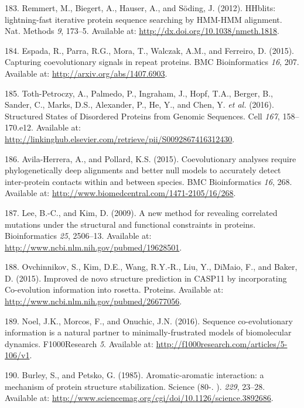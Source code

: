 \documentclass[11pt,a4paper,twoside]{book}
\theoremstyle{definition}
\theoremstyle{definition}
\theoremstyle{remark}
\begin{document}
\hypertarget{ref-Remmert2012}{}
183. Remmert, M., Biegert, A., Hauser, A., and Söding, J. (2012).
HHblits: lightning-fast iterative protein sequence searching by HMM-HMM
alignment. Nat. Methods \emph{9}, 173--5. Available at:
\url{http://dx.doi.org/10.1038/nmeth.1818}.

\hypertarget{ref-Espada2014}{}
184. Espada, R., Parra, R.G., Mora, T., Walczak, A.M., and Ferreiro, D.
(2015). Capturing coevolutionary signals in repeat proteins. BMC
Bioinformatics \emph{16}, 207. Available at:
\url{http://arxiv.org/abs/1407.6903}.

\hypertarget{ref-Toth-Petroczy2016}{}
185. Toth-Petroczy, A., Palmedo, P., Ingraham, J., Hopf, T.A., Berger,
B., Sander, C., Marks, D.S., Alexander, P., He, Y., and Chen, Y.
\emph{et al.} (2016). Structured States of Disordered Proteins from
Genomic Sequences. Cell \emph{167}, 158--170.e12. Available at:
\url{http://linkinghub.elsevier.com/retrieve/pii/S0092867416312430}.

\hypertarget{ref-Avila-Herrera2015a}{}
186. Avila-Herrera, A., and Pollard, K.S. (2015). Coevolutionary
analyses require phylogenetically deep alignments and better null models
to accurately detect inter-protein contacts within and between species.
BMC Bioinformatics \emph{16}, 268. Available at:
\url{http://www.biomedcentral.com/1471-2105/16/268}.

\hypertarget{ref-Lee2009}{}
187. Lee, B.-C., and Kim, D. (2009). A new method for revealing
correlated mutations under the structural and functional constraints in
proteins. Bioinformatics \emph{25}, 2506--13. Available at:
\url{http://www.ncbi.nlm.nih.gov/pubmed/19628501}.

\hypertarget{ref-Ovchinnikov2015b}{}
188. Ovchinnikov, S., Kim, D.E., Wang, R.Y.-R., Liu, Y., DiMaio, F., and
Baker, D. (2015). Improved de novo structure prediction in CASP11 by
incorporating Co-evolution information into rosetta. Proteins. Available
at: \url{http://www.ncbi.nlm.nih.gov/pubmed/26677056}.

\hypertarget{ref-Noel2016}{}
189. Noel, J.K., Morcos, F., and Onuchic, J.N. (2016). Sequence
co-evolutionary information is a natural partner to minimally-frustrated
models of biomolecular dynamics. F1000Research \emph{5}. Available at:
\url{http://f1000research.com/articles/5-106/v1}.

\hypertarget{ref-Burley1985}{}
190. Burley, S., and Petsko, G. (1985). Aromatic-aromatic interaction: a
mechanism of protein structure stabilization. Science (80-. ).
\emph{229}, 23--28. Available at:
\url{http://www.sciencemag.org/cgi/doi/10.1126/science.3892686}.
\end{document}

